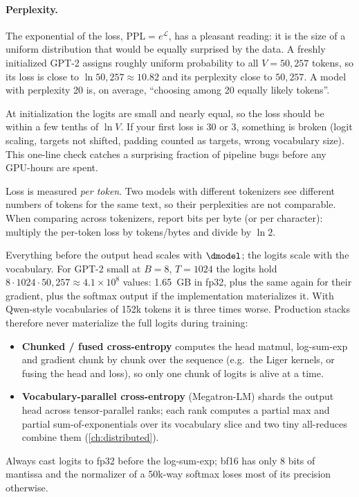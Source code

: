 \paragraph{Perplexity.} The exponential of the loss, $\mathrm{PPL}=e^{\mathcal L}$, has a
pleasant reading: it is the size of a uniform distribution that would be equally surprised by
the data. A freshly initialized GPT-2 assigns roughly uniform probability to all $V=50{,}257$
tokens, so its loss is close to $\ln 50{,}257 \approx 10.82$ and its perplexity close to
$50{,}257$. A model with perplexity 20 is, on average, ``choosing among 20 equally likely
tokens''.

\begin{keyidea}
At initialization the logits are small and nearly equal, so the loss should be within a few
tenths of $\ln V$. If your first loss is 30 or 3, something is broken (logit scaling,
targets not shifted, padding counted as targets, wrong vocabulary size). This one-line check
catches a surprising fraction of pipeline bugs before any GPU-hours are spent.
\end{keyidea}

\begin{pitfall}
Loss is measured \emph{per token}. Two models with different tokenizers see different numbers
of tokens for the same text, so their perplexities are not comparable. When comparing across
tokenizers, report bits per byte (or per character): multiply the per-token loss by
tokens/bytes and divide by $\ln 2$.
\end{pitfall}

\begin{systemslens}
Everything before the output head scales with $\dmodel$; the logits scale with the vocabulary.
For GPT-2 small at $B=8$, $T=1024$ the logits hold $8\cdot1024\cdot50{,}257\approx4.1\times10^8$
values: \SI{1.65}{GB} in fp32, plus the same again for their gradient, plus the softmax output
if the implementation materializes it. With Qwen-style vocabularies of 152k tokens it is three
times worse. Production stacks therefore never materialize the full logits during training:
\begin{itemize}
  \item \textbf{Chunked / fused cross-entropy} computes the head matmul, log-sum-exp and
    gradient chunk by chunk over the sequence (e.g.\ the Liger kernels, or 
    fusing the head and loss), so only one chunk of logits is alive at a time.
  \item \textbf{Vocabulary-parallel cross-entropy} (Megatron-LM) shards the output head across
    tensor-parallel ranks; each rank computes a partial max and partial sum-of-exponentials over
    its vocabulary slice and two tiny all-reduces combine them (\cref{ch:distributed}).
\end{itemize}
Always cast logits to fp32 before the log-sum-exp; bf16 has only 8 bits of mantissa and the
normalizer of a 50k-way softmax loses most of its precision otherwise.
\end{systemslens}

